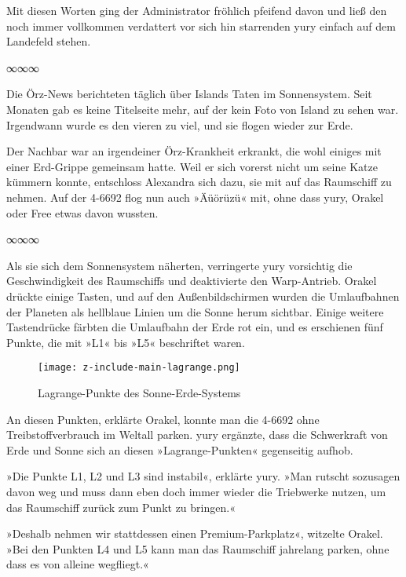 Mit diesen Worten ging der Administrator fröhlich pfeifend davon und ließ den noch immer vollkommen verdattert vor sich hin starrenden yury einfach auf dem Landefeld stehen.

\begin{center}
    ∞∞∞
\end{center}

Die Örz-News berichteten täglich über Islands Taten im Sonnensystem. Seit Monaten gab es keine Titelseite mehr, auf der kein Foto von Island zu sehen war. Irgendwann wurde es den vieren zu viel, und sie flogen wieder zur Erde.

Der Nachbar war an irgendeiner Örz-Krankheit erkrankt, die wohl einiges mit einer Erd-Grippe gemeinsam hatte. Weil er sich vorerst nicht um seine Katze kümmern konnte, entschloss Alexandra sich dazu, sie mit auf das Raumschiff zu nehmen. Auf der 4-6692 flog nun auch »Äüörüzü« mit, ohne dass yury, Orakel oder Free etwas davon wussten.

\begin{center}
    ∞∞∞
\end{center}

Als sie sich dem Sonnensystem näherten, verringerte yury vorsichtig die Geschwindigkeit des Raumschiffs und deaktivierte den Warp-Antrieb. Orakel drückte einige Tasten, und auf den Außenbildschirmen wurden die Umlaufbahnen der Planeten als hellblaue Linien um die Sonne herum sichtbar. Einige weitere Tastendrücke färbten die Umlaufbahn der Erde rot ein, und es erschienen fünf Punkte, die mit »L1« bis »L5« beschriftet waren.

\begin{figure}[p]
    \texttt{[image: z-include-main-lagrange.png]}
    \caption{Lagrange-Punkte des Sonne-Erde-Systems}
\end{figure}

An diesen Punkten, erklärte Orakel, konnte man die 4-6692 ohne Treibstoffverbrauch im Weltall parken. yury ergänzte, dass die Schwerkraft von Erde und Sonne sich an diesen »Lagrange-Punkten« gegenseitig aufhob.

»Die Punkte L1, L2 und L3 sind instabil«, erklärte yury. »Man rutscht sozusagen davon weg und muss dann eben doch immer wieder die Triebwerke nutzen, um das Raumschiff zurück zum Punkt zu bringen.«

»Deshalb nehmen wir stattdessen einen Premium-Parkplatz«, witzelte Orakel. »Bei den Punkten L4 und L5 kann man das Raumschiff jahrelang parken, ohne dass es von alleine wegfliegt.«

